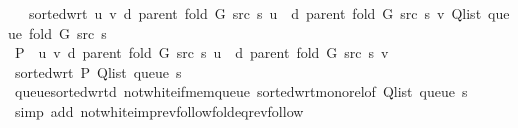 \begin{isabellebody}
\ \ \ {\isachardoublequoteopen}sorted{\isacharunderscore}{\kern0pt}wrt\ {\isacharparenleft}{\kern0pt}{\isasymlambda}u\ v{\isachardot}{\kern0pt}\ d\ {\isacharparenleft}{\kern0pt}parent\ {\isacharparenleft}{\kern0pt}fold\ G\ src\ s{\isacharparenright}{\kern0pt}{\isacharparenright}{\kern0pt}\ u\ {\isasymle}\ d\ {\isacharparenleft}{\kern0pt}parent\ {\isacharparenleft}{\kern0pt}fold\ G\ src\ s{\isacharparenright}{\kern0pt}{\isacharparenright}{\kern0pt}\ v{\isacharparenright}{\kern0pt}\ {\isacharparenleft}{\kern0pt}Q{\isacharunderscore}{\kern0pt}list\ {\isacharparenleft}{\kern0pt}queue\ {\isacharparenleft}{\kern0pt}fold\ G\ src\ s{\isacharparenright}{\kern0pt}{\isacharparenright}{\kern0pt}{\isacharparenright}{\kern0pt}{\isachardoublequoteclose}\isanewline
%
\isadelimproof
%
\endisadelimproof
%
\isatagproof
{}\isamarkupfalse%
\ {\isacharminus}{\kern0pt}\isanewline
\ \ \isamarkupfalse%
\ {\isacharquery}{\kern0pt}P\ {\isacharequal}{\kern0pt}\ {\isachardoublequoteopen}{\isasymlambda}u\ v{\isachardot}{\kern0pt}\ d\ {\isacharparenleft}{\kern0pt}parent\ {\isacharparenleft}{\kern0pt}fold\ G\ src\ s{\isacharparenright}{\kern0pt}{\isacharparenright}{\kern0pt}\ u\ {\isasymle}\ d\ {\isacharparenleft}{\kern0pt}parent\ {\isacharparenleft}{\kern0pt}fold\ G\ src\ s{\isacharparenright}{\kern0pt}{\isacharparenright}{\kern0pt}\ v{\isachardoublequoteclose}\isanewline
\ \ \isamarkupfalse%
\ {\isachardoublequoteopen}sorted{\isacharunderscore}{\kern0pt}wrt\ {\isacharquery}{\kern0pt}P\ {\isacharparenleft}{\kern0pt}Q{\isacharunderscore}{\kern0pt}list\ {\isacharparenleft}{\kern0pt}queue\ s{\isacharparenright}{\kern0pt}{\isacharparenright}{\kern0pt}{\isachardoublequoteclose}\isanewline
\ \ \ \ \isamarkupfalse%
\ queue{\isacharunderscore}{\kern0pt}sorted{\isacharunderscore}{\kern0pt}wrt{\isacharunderscore}{\kern0pt}d\ not{\isacharunderscore}{\kern0pt}white{\isacharunderscore}{\kern0pt}if{\isacharunderscore}{\kern0pt}mem{\isacharunderscore}{\kern0pt}queue\ sorted{\isacharunderscore}{\kern0pt}wrt{\isacharunderscore}{\kern0pt}mono{\isacharunderscore}{\kern0pt}rel{\isacharbrackleft}{\kern0pt}of\ {\isachardoublequoteopen}{\isacharparenleft}{\kern0pt}Q{\isacharunderscore}{\kern0pt}list\ {\isacharparenleft}{\kern0pt}queue\ s{\isacharparenright}{\kern0pt}{\isacharparenright}{\kern0pt}{\isachardoublequoteclose}{\isacharbrackright}{\kern0pt}\isanewline
\ \ \ \ \isamarkupfalse%
\ {\isacharparenleft}{\kern0pt}simp\ add{\isacharcolon}{\kern0pt}\ not{\isacharunderscore}{\kern0pt}white{\isacharunderscore}{\kern0pt}imp{\isacharunderscore}{\kern0pt}rev{\isacharunderscore}{\kern0pt}follow{\isacharunderscore}{\kern0pt}fold{\isacharunderscore}{\kern0pt}eq{\isacharunderscore}{\kern0pt}rev{\isacharunderscore}{\kern0pt}follow{\isacharparenright}{\kern0pt}\isanewline

\end{isabellebody}
